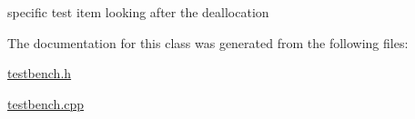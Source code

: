 specific test item looking after the deallocation 

The documentation for this class was generated from the following files\-:\begin{DoxyCompactItemize}
\item 
\hyperlink{testbench_8h}{testbench.\-h}\item 
\hyperlink{testbench_8cpp}{testbench.\-cpp}\end{DoxyCompactItemize}

